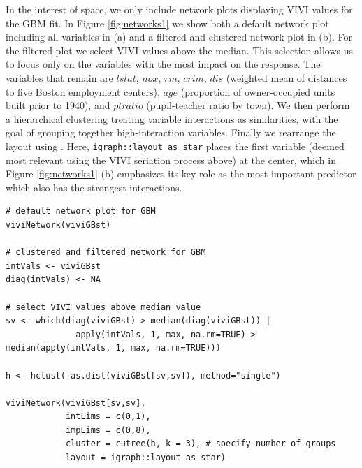 In the interest of space, we only include network plots displaying VIVI values for the GBM fit. In Figure \ref{fig:networks1} we show both a default network plot including all variables in (a) and a filtered and clustered network plot in (b). For the filtered plot we select VIVI values above the median. This selection allows us to focus only on the variables with the most impact on the response. The variables that remain are \(lstat\), \(nox\), \(rm\), \(crim\), \(dis\) (weighted mean of distances to five Boston employment centers), \(age\) (proportion of owner-occupied units built prior to 1940), and \(ptratio\) (pupil-teacher ratio by town). We then perform a hierarchical clustering treating variable interactions as similarities, with the goal of grouping together high-interaction variables. Finally we rearrange the layout using . Here, \texttt{igraph::layout\_as\_star} places the first variable (deemed most relevant using the VIVI seriation process above) at the center, which in Figure \ref{fig:networks1} (b) emphasizes its key role as the most important predictor which also has the strongest interactions.

\begin{verbatim}
# default network plot for GBM
viviNetwork(viviGBst)

# clustered and filtered network for GBM
intVals <- viviGBst
diag(intVals) <- NA 

# select VIVI values above median value
sv <- which(diag(viviGBst) > median(diag(viviGBst)) |
              apply(intVals, 1, max, na.rm=TRUE) > median(apply(intVals, 1, max, na.rm=TRUE)))
              
h <- hclust(-as.dist(viviGBst[sv,sv]), method="single")

viviNetwork(viviGBst[sv,sv],
            intLims = c(0,1),
            impLims = c(0,8),
            cluster = cutree(h, k = 3), # specify number of groups
            layout = igraph::layout_as_star)
\end{verbatim}

